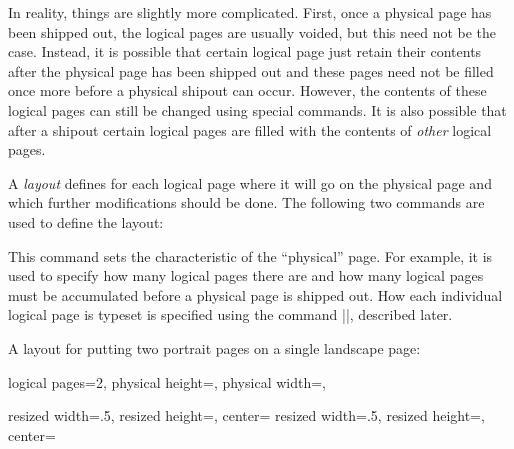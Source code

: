 In reality, things are slightly more complicated. First, once a
physical page has been shipped out, the logical pages are usually
voided, but this need not be the case. Instead, it is possible that
certain logical page just retain their contents after the physical
page has been shipped out and these pages need not be filled once more
before a physical shipout can occur. However, the contents of these
logical pages can still be changed using special commands. It is also
possible that after a shipout certain logical pages are filled with
the contents of \emph{other} logical pages.

A \emph{layout} defines for each logical page where it will go on the
physical page and which further modifications should be done. The
following two commands are used to define the layout:

\begin{command}{\pgfpagesphysicalpageoptions{}}
  This command sets the characteristic of the ``physical'' page. For
  example, it is used to specify how many logical pages there are and
  how many logical pages must be accumulated before a physical page is
  shipped out. How each individual logical page is typeset is
  specified using the command |\pgfpageslogicalpageoptions|, described
  later.

  \example A layout for putting two portrait pages on a single
  landscape page:
\begin{codeexample}
\pgfpagesphysicalpageoptions
{%
  logical pages=2,%
  physical height=\paperwidth,%
  physical width=\paperheight,%
}

{%
  resized width=.5\pgfphysicalwidth,%
  resized height=\pgfphysicalheight,%
  center=\pgfpoint{.25\pgfphysicalwidth}{.5\pgfphysicalheight}%
}%
{%
  resized width=.5\pgfphysicalwidth,%
  resized height=\pgfphysicalheight,%
  center=\pgfpoint{.75\pgfphysicalwidth}{.5\pgfphysicalheight}%
}%
\end{codeexample}


\end{command}
